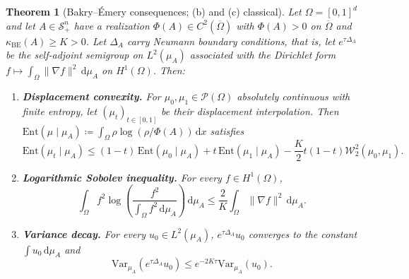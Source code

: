 \documentclass[11pt,a4paper,reqno]{amsart}
\newtheorem{theorem}{Theorem}[section]
\theoremstyle{definition}
\numberwithin{equation}{section}
\newcommand{\dif}{\,\mathrm{d}}
\begin{document}
\begin{theorem}[Bakry--\'Emery consequences; (b) and (c) classical]
\label{thm:bakry_emery}
Let $\Omega = [0, 1]^d$ and let $A \in \mathcal{S}_+^n$ have a realization $\Phi(A) \in C^2(\overline{\Omega})$ with $\Phi(A) > 0$ on $\overline{\Omega}$ and $\kappa_{\mathrm{BE}}(A) \ge K > 0$. Let $\Delta_A$ carry Neumann boundary conditions, that is, let $e^{\tau\Delta_A}$ be the self-adjoint semigroup on $L^2(\mu_A)$ associated with the Dirichlet form $f \mapsto \int_\Omega \|\nabla f\|^2 \dif\mu_A$ on $H^1(\Omega)$. Then:
\begin{enumerate}[label=(\alph*)]
    \item \textbf{Displacement convexity.} For $\mu_0, \mu_1 \in \mathcal{P}(\Omega)$ absolutely continuous with finite entropy, let $(\mu_t)_{t \in [0,1]}$ be their displacement interpolation. Then $\mathrm{Ent}(\mu \mid \mu_A) \coloneqq \int_\Omega \rho \log(\rho / \Phi(A)) \dif x$ satisfies
    \begin{equation}
        \mathrm{Ent}(\mu_t \mid \mu_A) \le (1-t)\,\mathrm{Ent}(\mu_0 \mid \mu_A) + t\,\mathrm{Ent}(\mu_1 \mid \mu_A) - \frac{K}{2} t(1-t) \mathcal{W}_2^2(\mu_0, \mu_1).
    \end{equation}
    \item \textbf{Logarithmic Sobolev inequality.} For every $f \in H^1(\Omega)$,
    \begin{equation}
        \int_\Omega f^2 \log\left(\frac{f^2}{\int_\Omega f^2 \dif\mu_A}\right) \dif\mu_A \le \frac{2}{K} \int_\Omega \|\nabla f\|^2 \dif\mu_A.
    \end{equation}
    \item \textbf{Variance decay.} For every $u_0 \in L^2(\mu_A)$, $e^{\tau\Delta_A}u_0$ converges to the constant $\int u_0 \dif\mu_A$ and
    \begin{equation}
        \mathrm{Var}_{\mu_A}(e^{\tau \Delta_A} u_0) \le e^{-2K\tau} \mathrm{Var}_{\mu_A}(u_0).
    \end{equation}
\end{enumerate}
\end{theorem}
\end{document}
